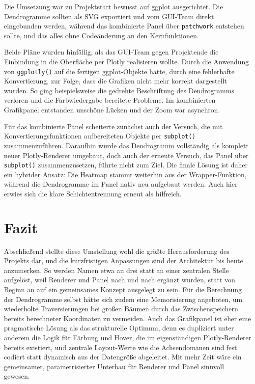 \documentclass[11pt,a4paper]{article}
\newcommand{\code}[1]{\texttt{#1}}
\begin{document}
	Die Umsetzung war zu Projektstart bewusst auf ggplot ausgerichtet. Die Dendrogramme 
	sollten als SVG exportiert und vom GUI-Team direkt eingebunden werden, während das 
	kombinierte Panel über \code{patchwork} entstehen sollte, und das alles ohne 
	Codeänderung an den Kernfunktionen.
	
	Beide Pläne wurden hinfällig, als das GUI-Team gegen Projektende die Einbindung in 
	die Oberfläche per Plotly realisieren wollte. Durch die Anwendung  von \code{ggplotly()} auf die fertigen 
	ggplot-Objekte
	hatte, durch eine fehlerhafte Konvertierung, zur Folge, dass die Grafiken nicht mehr korrekt 
	dargestellt wurden. So ging beispielsweise die gedrehte Beschriftung des Dendrogramms 
	verloren und die Farbwiedergabe bereitete Probleme. Im kombinierten Grafikpanel 
	entstanden unschöne Lücken und der Zoom war asynchron.
	
	Für das kombinierte Panel scheiterte zunächst auch der Versuch, die mit 
	Konvertierungsfunktionen aufbereiteten Objekte per \code{subplot()} zusammenzuführen. 
	Daraufhin wurde das Dendrogramm vollständig als komplett neuer Plotly-Renderer 
	umgebaut, doch auch der erneute Versuch, das Panel über \code{subplot()} 
	zusammenzusetzen, führte nicht zum Ziel. Die finale Lösung ist daher ein hybrider 
	Ansatz: Die Heatmap stammt weiterhin aus der Wrapper-Funktion, während die 
	Dendrogramme im Panel nativ neu aufgebaut werden. Auch hier erwies sich die klare 
	Schichtentrennung erneut als hilfreich.
	
	\section{Fazit}
	
Abschließend stellte diese Umstellung wohl die größte Herausforderung des Projekts 
dar, und die kurzfristigen Anpassungen sind der Architektur bis heute anzumerken. So 
werden Namen etwa an drei statt an einer zentralen Stelle aufgelöst, weil Renderer 
und Panel nach und nach ergänzt wurden, statt von Beginn an auf ein gemeinsames 
Konzept ausgelegt zu sein. Für die Berechnung der Dendrogramme selbst hätte sich 
zudem eine Memorisierung angeboten, um wiederholte Traversierungen bei großen Bäumen 
durch das Zwischenspeichern bereits berechneter Koordinaten zu vermeiden. Auch das 
Grafikpanel ist eher eine pragmatische Lösung als das strukturelle Optimum, denn es 
dupliziert unter anderem die Logik für Färbung und Hover, die im eigenständigen 
Plotly-Renderer bereits existiert, und zentrale Layout-Werte wie die Achsendomänen 
sind fest codiert statt dynamisch aus der Datengröße abgeleitet. Mit mehr Zeit wäre 
ein gemeinsamer, parametrisierter Unterbau für Renderer und Panel sinnvoll gewesen.
\clearpage
\end{document}
